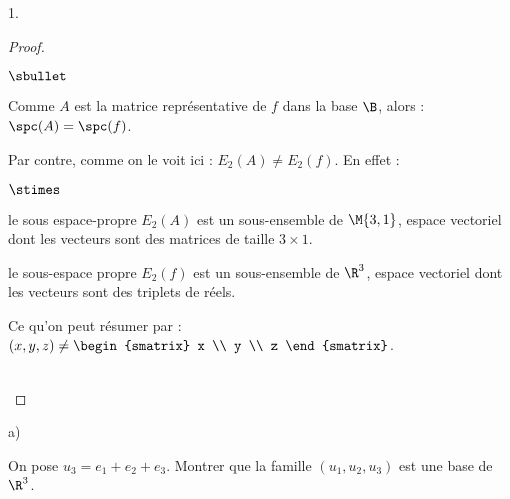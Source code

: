 \begin{noliste}{1.}
\begin{proof}
    \begin{remark}%
      \begin{noliste}{$\sbullet$}
      \item Comme $A$ est la matrice représentative de $f$ dans la
        base $\B$, alors : $\spc(A) = \spc(f)$.
      \item Par contre, comme on le voit ici : $E_2(A) \neq
        E_2(f)$. En effet :
        \begin{noliste}{$\stimes$}
        \item le sous espace-propre $E_2(A)$ est un sous-ensemble de
          $\M{3,1}$, espace vectoriel dont les vecteurs sont des
          matrices de taille $3 \times 1$.
        \item le sous-espace propre $E_2(f)$ est un sous-ensemble de
          $\R^3$, espace vectoriel dont les vecteurs sont des triplets
          de réels.
        \end{noliste}
        Ce qu'on peut résumer par : $(x, y, z) \neq
        \begin{smatrix}
          x \\
          y \\
          z
        \end{smatrix}
        $.
      \end{noliste}
    \end{remark}~\\[-1.4cm]
  \end{proof}

\item 
  \begin{noliste}{a)}
    \setlength{\itemsep}{2mm}
  \item On pose $u_{3} = e_{1} + e_{2} + e_{3}$. Montrer que la
    famille $(u_{1},u_{2},u_{3})$ est une base de $\R^{3}$.


\end{noliste}
\end{noliste}
